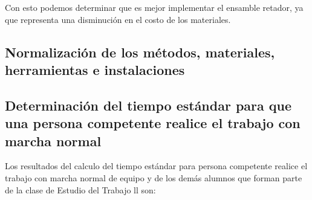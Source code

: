     Con esto podemos determinar que es mejor implementar el ensamble retador, ya que representa una disminución en el costo de los materiales.
    
    
    \subsection{Normalización de los métodos, materiales, herramientas e instalaciones}
    
    \subsection{Determinación del tiempo estándar para que una persona competente realice el trabajo con marcha normal}
    Los resultados del calculo del tiempo estándar para persona competente realice el trabajo con marcha normal de equipo y de los demás alumnos que forman parte de la clase de Estudio del Trabajo ll son:
    
